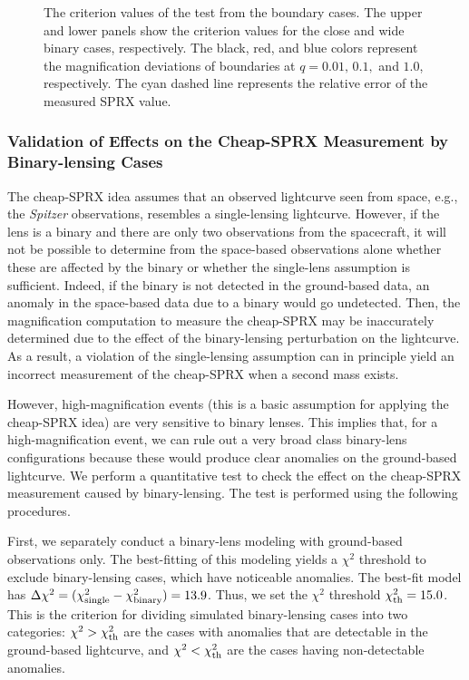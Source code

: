 \documentclass[10pt]{emulateapj}
\begin{document}
\begin{figure*}[htb!]
\caption{
The criterion values of the test from the boundary cases.
The upper and lower panels show the criterion values for the close and wide binary cases, 
respectively. The black, red, and blue colors represent the magnification deviations of boundaries 
at $q=0.01,\,0.1,$ and $1.0$, respectively. The cyan dashed line represents the relative error of 
the measured SPRX value.
\label{fig:six}}
\end{figure*}

\subsubsection{Validation of Effects on the Cheap-SPRX Measurement by Binary-lensing Cases}

 The cheap-SPRX idea assumes that an observed lightcurve seen from space, e.g., 
the {\it Spitzer} observations, resembles a single-lensing lightcurve. However, 
if the lens is a binary and there are only two observations from the spacecraft, 
it will not be possible to determine from the space-based observations alone 
whether these are affected by the binary or whether the single-lens assumption 
is sufficient. Indeed, if the binary is not detected in the ground-based data, 
an anomaly in the space-based data due to a binary would go undetected. Then, 
the magnification computation to measure the cheap-SPRX may be inaccurately 
determined due to the effect of the binary-lensing perturbation on the lightcurve. 
As a result, a violation of the single-lensing assumption can in principle yield 
an incorrect measurement of the cheap-SPRX when a second mass exists.

However, high-magnification events (this is a basic assumption for applying 
the cheap-SPRX idea) are very sensitive to binary lenses. This implies that, 
for a high-magnification event, we can rule out a very broad class binary-lens 
configurations because these would produce clear anomalies on the ground-based 
lightcurve. We perform a quantitative test to check the effect on the cheap-SPRX 
measurement caused by binary-lensing. The test is performed using the following 
procedures.

 First, we separately conduct a binary-lens modeling with ground-based 
observations only. The best-fitting of this modeling yields a $\chi^2$ threshold 
to exclude binary-lensing cases, which have noticeable anomalies. The best-fit 
model has $\Delta\chi^2=(\chi^2_{\rm single}-\chi^2_{\rm binary})=13.9$.
Thus, we set the $\chi^2$ threshold $\chi^2_{\rm th}=15.0$. This is the criterion 
for dividing simulated binary-lensing cases into two categories: $\chi^2 > 
\chi^2_{\rm th}$ are the cases with anomalies that are detectable in the ground-based 
lightcurve, and $\chi^2 < \chi^2_{\rm th}$ are the cases having non-detectable anomalies.
\end{document}
